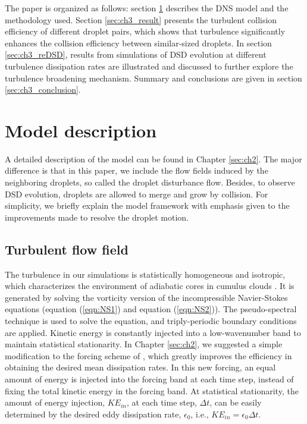 The paper is organized as follows: section \ref{sec:ch3_model} describes the DNS model and the methodology used. Section \ref{sec:ch3_result} presents the turbulent collision efficiency of different droplet pairs, which shows that turbulence significantly enhances the collision efficiency between similar-sized droplets. In section \ref{sec:ch3_reDSD}, results from simulations of DSD evolution at different turbulence dissipation rates are illustrated and discussed to further explore the turbulence broadening mechanism. Summary and conclusions are given in section \ref{sec:ch3_conclusion}.

\section{Model description} \label{sec:ch3_model}
A detailed description of the model can be found in Chapter \ref{sec:ch2}. The major difference is that in this paper, we include the flow fields induced by the neighboring droplets, so called the droplet disturbance flow. Besides, to observe DSD evolution, droplets are allowed to merge and grow by collision. For simplicity, we briefly explain the model framework with emphasis given to the improvements made to resolve the droplet motion. 

\subsection{Turbulent flow field}\label{sec:ch3_turb}

The turbulence in our simulations is statistically homogeneous and isotropic, which characterizes the environment of adiabatic cores in cumulus clouds \citep{Vaillancourt2000}. It is generated by solving the vorticity version of the incompressible Navier-Stokes equations (equation (\ref{eqn:NS1}) and equation (\ref{eqn:NS2})). The pseudo-spectral technique \citep{Orszag1969} is used to solve the equation, and triply-periodic boundary conditions are applied. Kinetic energy is constantly injected into a low-wavenumber band to maintain statistical stationarity. In Chapter \ref{sec:ch2}, we suggested a simple modification to the forcing scheme of \citet{Sullivan1994}, which greatly improves the efficiency in obtaining the desired mean dissipation rates. In this new forcing, an equal amount of energy is injected into the forcing band at each time step, instead of fixing the total kinetic energy in the forcing band. At statistical stationarity, the amount of energy injection, $KE_{in}$, at each time step, $\Delta t$, can be easily determined by the desired eddy dissipation rate, $\epsilon_0$, i.e., $KE_{in}=\epsilon_0 \Delta t$. 

